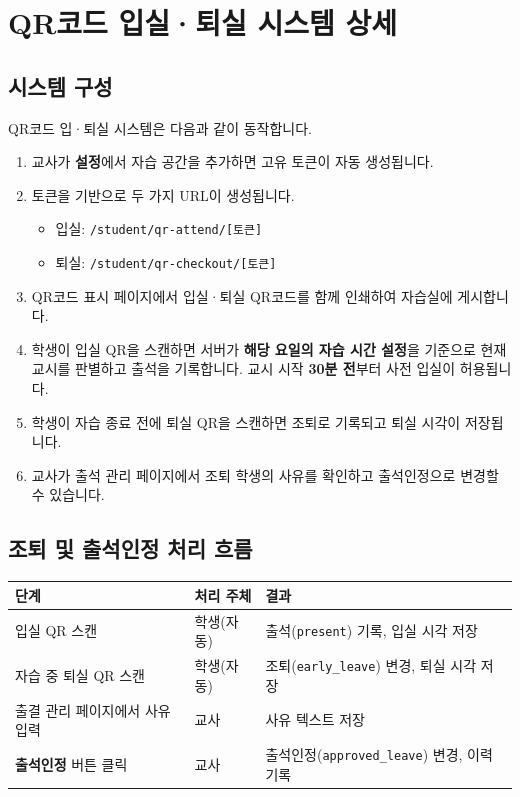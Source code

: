 \documentclass[a4paper,12pt]{article}
\newcommand{\menu}[1]{\textcolor{primary}{\textbf{#1}}}
\begin{document}
\section{QR코드 입실·퇴실 시스템 상세}

\subsection{시스템 구성}

QR코드 입·퇴실 시스템은 다음과 같이 동작합니다.

\begin{enumerate}[leftmargin=1.5em, label=\arabic*단계:]
    \item 교사가 \menu{설정}에서 자습 공간을 추가하면 고유 토큰이 자동 생성됩니다.
    \item 토큰을 기반으로 두 가지 URL이 생성됩니다.
          \begin{itemize}
              \item 입실: \texttt{/student/qr-attend/[토큰]}
              \item 퇴실: \texttt{/student/qr-checkout/[토큰]}
          \end{itemize}
    \item QR코드 표시 페이지에서 입실·퇴실 QR코드를 함께 인쇄하여 자습실에 게시합니다.
    \item 학생이 입실 QR을 스캔하면 서버가 \textbf{해당 요일의 자습 시간 설정}을 기준으로
          현재 교시를 판별하고 출석을 기록합니다.
          교시 시작 \textbf{30분 전}부터 사전 입실이 허용됩니다.
    \item 학생이 자습 종료 전에 퇴실 QR을 스캔하면 조퇴로 기록되고 퇴실 시각이 저장됩니다.
    \item 교사가 출석 관리 페이지에서 조퇴 학생의 사유를 확인하고 출석인정으로 변경할 수 있습니다.
\end{enumerate}

\subsection{조퇴 및 출석인정 처리 흐름}

\begin{center}
\begin{tabular}{lll}
\toprule
\textbf{단계} & \textbf{처리 주체} & \textbf{결과} \\
\midrule
입실 QR 스캔                  & 학생(자동)    & 출석(\texttt{present}) 기록, 입실 시각 저장 \\
자습 중 퇴실 QR 스캔          & 학생(자동)    & 조퇴(\texttt{early\_leave}) 변경, 퇴실 시각 저장 \\
출결 관리 페이지에서 사유 입력 & 교사          & 사유 텍스트 저장 \\
\menu{출석인정} 버튼 클릭      & 교사          & 출석인정(\texttt{approved\_leave}) 변경, 이력 기록 \\
\bottomrule
\end{tabular}
\end{center}
\end{document}
